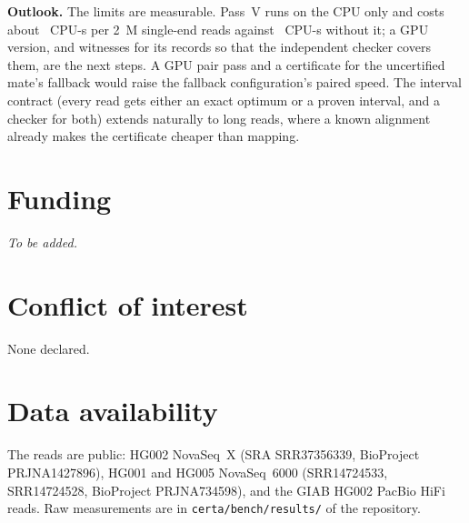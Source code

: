 \documentclass[11pt]{article}
\theoremstyle{definition}
\begin{document}
\textbf{Outlook.} The limits are measurable. Pass~V runs on the CPU only
and costs about \SlSeFcCpu~CPU-s per 2~M single-end reads against
\SlSeNoVCpu~CPU-s without it; a GPU version, and witnesses for its records
so that the independent checker covers them, are the next steps. A GPU pair
pass and a certificate for the uncertified mate's fallback would raise the
fallback configuration's paired speed. The interval
contract (every read gets either an exact optimum or a proven interval,
and a checker for both) extends naturally to long reads, where a known
alignment already makes the certificate cheaper than mapping.

\section*{Funding}
\textit{To be added.}

\section*{Conflict of interest}
None declared.

\section*{Data availability}
The reads are public: HG002 NovaSeq~X (SRA SRR37356339, BioProject
PRJNA1427896), HG001 and HG005 NovaSeq~6000 (SRR14724533, SRR14724528,
BioProject PRJNA734598), and the GIAB HG002 PacBio HiFi reads. Raw
measurements are in \texttt{certa/bench/results/} of the repository.



\end{document}
